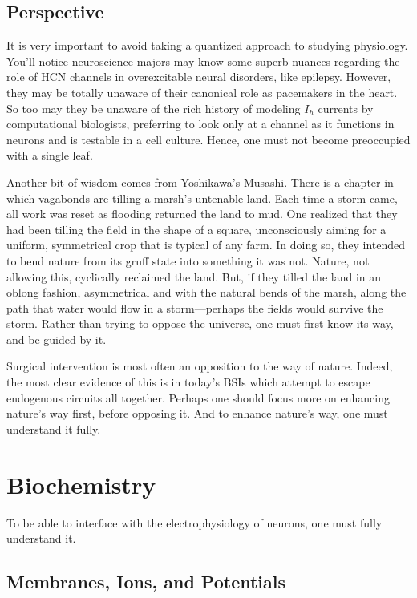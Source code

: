 \documentclass[12pt]{report}
\begin{document}
\section{Perspective}

It is very important to avoid taking a quantized approach to studying physiology. You'll notice neuroscience majors may know some superb nuances regarding the role of HCN channels in overexcitable neural disorders, like epilepsy. However, they may be totally unaware of their canonical role as pacemakers in the heart. So too may they be unaware of the rich history of modeling $I_h$ currents by computational biologists, preferring to look only at a channel as it functions in neurons and is testable in a cell culture. Hence, one must not become preoccupied with a single leaf.\newline

Another bit of wisdom comes from Yoshikawa's Musashi. There is a chapter in which vagabonds are tilling a marsh's untenable land. Each time a storm came, all work was reset as flooding returned the land to mud. One realized that they had been tilling the field in the shape of a square, unconsciously aiming for a uniform, symmetrical crop that is typical of any farm. In doing so, they intended to bend nature from its gruff state into something it was not. Nature, not allowing this, cyclically reclaimed the land. But, if they tilled the land in an oblong fashion, asymmetrical and with the natural bends of the marsh, along the path that water would flow in a storm---perhaps the fields would survive the storm. Rather than trying to oppose the universe, one must first know its way, and be guided by it.\newline

Surgical intervention is most often an opposition to the way of nature. Indeed, the most clear evidence of this is in today's BSIs which attempt to escape endogenous circuits all together. Perhaps one should focus more on enhancing nature's way first, before opposing it. And to enhance nature's way, one must understand it fully. 

\chapter{Biochemistry}

To be able to interface with the electrophysiology of neurons, one must fully understand it. 

\section{Membranes, Ions, and Potentials}
\end{document}
